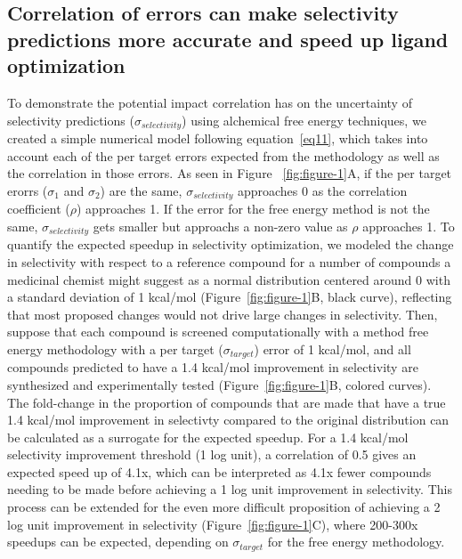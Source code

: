 \documentclass[phd,tocprelim]{cornell}
\begin{document}
\subsection{Correlation of errors can make selectivity predictions more accurate and speed up ligand optimization}

To demonstrate the potential impact correlation has on the uncertainty of selectivity predictions ($\sigma_{selectivity}$) using alchemical free energy techniques, we created a simple numerical model following equation~\ref{eq11}, which takes into account each of the per target errors expected from the methodology as well as the correlation in those errors. As seen in Figure ~\ref{fig:figure-1}A, if the per target erorrs ($\sigma_1$ and $\sigma_2$) are the same, $\sigma_{selectivity}$ approaches 0 as the correlation coefficient ($\rho$) approaches 1. If the error for the free energy method is not the same, $\sigma_{selectivity}$ gets smaller but approachs a non-zero value as $\rho$ approaches 1. 
To quantify the expected speedup in selectivity optimization, we modeled the change in selectivity with respect to a reference compound for a number of compounds a medicinal chemist might suggest as a normal distribution centered around 0 with a standard deviation of 1 kcal/mol (Figure~\ref{fig:figure-1}B, black curve), reflecting that most proposed changes would not drive large changes in selectivity. Then, suppose that each compound is screened computationally with a method free energy methodology with a per target ($\sigma_{target}$) error of 1 kcal/mol, and all compounds predicted to have a 1.4 kcal/mol improvement in selectivity are synthesized and experimentally tested (Figure~\ref{fig:figure-1}B, colored curves). The fold-change in the proportion of compounds that are made that have a true 1.4 kcal/mol improvement in selectivty compared to the original distribution can be calculated as a surrogate for the expected speedup. For a 1.4 kcal/mol selectivity improvement threshold (1 log unit), a correlation of 0.5 gives an expected speed up of 4.1x, which can be interpreted as 4.1x fewer compounds needing to be made before achieving a 1 log unit improvement in selectivity. This process can be extended for the even more difficult proposition of achieving a 2 log unit improvement in selectivity (Figure~\ref{fig:figure-1}C), where 200-300x speedups can be expected, depending on $\sigma_{target}$ for the free energy methodology. 
\end{document}
